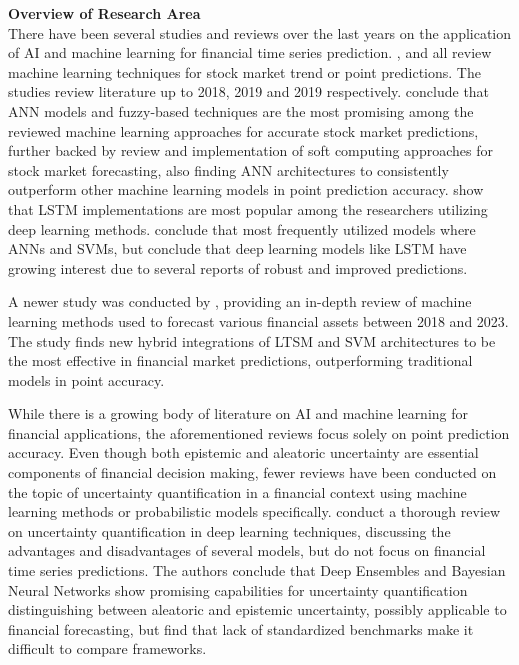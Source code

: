 
\textbf{Overview of Research Area}\\
There have been several studies and reviews over the last years on the application of AI and machine learning for financial time series prediction. \textcite{gandhmalstockmarket2019}, \textcite{Li2020} and \textcite{Kumbure2022} all review machine learning techniques for stock market trend or point predictions. The studies review literature up to 2018, 2019 and 2019 respectively. \textcite{gandhmalstockmarket2019} conclude that ANN models and fuzzy-based techniques are the most promising among the reviewed machine learning approaches for accurate stock market predictions, further backed by \textcite{shi2019soft} review and implementation of soft computing approaches for stock market forecasting, also finding ANN architectures to consistently outperform other machine learning models in point prediction accuracy. \textcite{Li2020} show that LSTM implementations are most popular among the researchers utilizing deep learning methods. \textcite{Kumbure2022} conclude that most frequently utilized models where ANNs and SVMs, but conclude that deep learning models like LSTM have growing interest due to several reports of robust and improved predictions. 

A newer study was conducted by \textcite{Khattak2023SurveyAIModels}, providing an in-depth review of machine learning methods used to forecast various financial assets between 2018 and 2023. The study finds new hybrid integrations of LTSM and SVM architectures to be the most effective in financial market predictions, outperforming traditional models in point accuracy.

While there is a growing body of literature on AI and machine learning for financial applications, the aforementioned reviews focus solely on point prediction accuracy. Even though both epistemic and aleatoric uncertainty are essential components of financial decision making, fewer reviews have been conducted on the topic of uncertainty quantification in a financial context using machine learning methods or probabilistic models specifically. \textcite{abdar2021ReviewUQ} conduct a thorough review on uncertainty quantification in deep learning techniques, discussing the advantages and disadvantages of several models, but do not focus on financial time series predictions. The authors conclude that Deep Ensembles and Bayesian Neural Networks show promising capabilities for uncertainty quantification distinguishing between aleatoric and epistemic uncertainty, possibly applicable to financial forecasting, but find that lack of standardized benchmarks make it difficult to compare frameworks.

